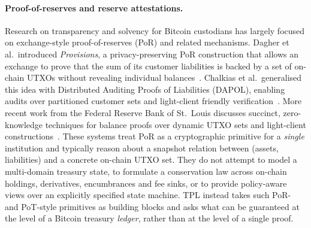 \documentclass[11pt]{article}
\begin{document}
\paragraph{Proof-of-reserves and reserve attestations.}
Research on transparency and solvency for Bitcoin custodians has largely focused on exchange-style proof-of-reserves (PoR) and related mechanisms.
Dagher et al.\ introduced \emph{Provisions}, a privacy-preserving PoR construction that allows an exchange to prove that the sum of its customer liabilities is backed by a set of on-chain UTXOs without revealing individual balances~\cite{Dagher2015}.
Chalkias et al.\ generalised this idea with Distributed Auditing Proofs of Liabilities (DAPOL), enabling audits over partitioned customer sets and light-client friendly verification~\cite{Chalkias2018}.
More recent work from the Federal Reserve Bank of St.~Louis discusses succinct, zero-knowledge techniques for balance proofs over dynamic UTXO sets and light-client constructions~\cite{OzmisZkBitcoin2025}.
These systems treat PoR as a cryptographic primitive for a \emph{single} institution and typically reason about a snapshot relation between (assets, liabilities) and a concrete on-chain UTXO set.
They do not attempt to model a multi-domain treasury state, to formulate a conservation law across on-chain holdings, derivatives, encumbrances and fee sinks, or to provide policy-aware views over an explicitly specified state machine.
TPL instead takes such PoR- and PoT-style primitives as building blocks and asks what can be guaranteed at the level of a Bitcoin treasury \emph{ledger}, rather than at the level of a single proof.
\end{document}
